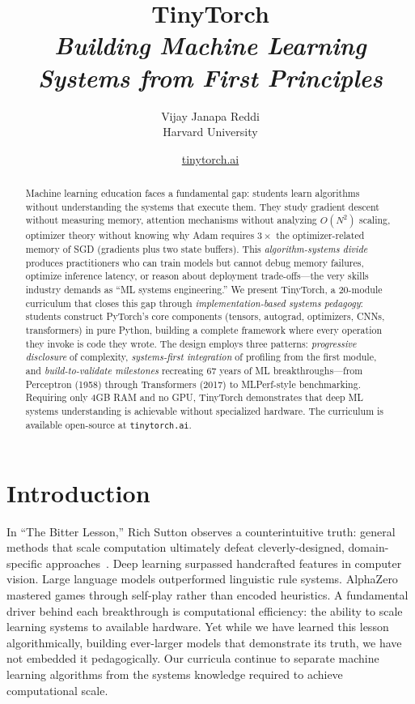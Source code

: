 \documentclass[10pt,twocolumn]{article}
\title{
  \Huge\bfseries Tiny\emoji{fire}Torch\\[0.4em]
  \Large\normalfont\itshape Building Machine Learning Systems from First Principles
}
\author{
  \fontsize{12}{15}\selectfont
  Vijay Janapa Reddi\\[0.2em]
  \fontsize{11}{14}\selectfont
  Harvard University
}
\date{\href{https://tinytorch.ai/}{tinytorch.ai}}
\begin{document}
\thispagestyle{plain}
\maketitle
\begingroup
\renewcommand{\thefootnote}{}%
%
\endgroup

\begin{abstract}
  Machine learning education faces a fundamental gap: students learn algorithms without understanding the systems that execute them. They study gradient descent without measuring memory, attention mechanisms without analyzing $O(N^2)$ scaling, optimizer theory without knowing why Adam requires $3\times$ the optimizer-related memory of SGD (gradients plus two state buffers). This \emph{algorithm-systems divide} produces practitioners who can train models but cannot debug memory failures, optimize inference latency, or reason about deployment trade-offs---the very skills industry demands as ``ML systems engineering.'' We present TinyTorch, a 20-module curriculum that closes this gap through \emph{implementation-based systems pedagogy}: students construct PyTorch's core components (tensors, autograd, optimizers, CNNs, transformers) in pure Python, building a complete framework where every operation they invoke is code they wrote. The design employs three patterns: \emph{progressive disclosure} of complexity, \emph{systems-first integration} of profiling from the first module, and \emph{build-to-validate milestones} recreating 67 years of ML breakthroughs---from Perceptron (1958) through Transformers (2017) to MLPerf-style benchmarking. Requiring only 4GB RAM and no GPU, TinyTorch demonstrates that deep ML systems understanding is achievable without specialized hardware. The curriculum is available open-source at \texttt{tinytorch.ai}.
  \end{abstract}

\section{Introduction}
\label{sec:intro}

In ``The Bitter Lesson,'' Rich Sutton observes a counterintuitive truth: general methods that scale computation ultimately defeat cleverly-designed, domain-specific approaches~\citep{sutton2019bitter}. Deep learning surpassed handcrafted features in computer vision. Large language models outperformed linguistic rule systems. AlphaZero mastered games through self-play rather than encoded heuristics. A fundamental driver behind each breakthrough is computational efficiency: the ability to scale learning systems to available hardware. Yet while we have learned this lesson algorithmically, building ever-larger models that demonstrate its truth, we have not embedded it pedagogically. Our curricula continue to separate machine learning algorithms from the systems knowledge required to achieve computational scale.
\end{document}
